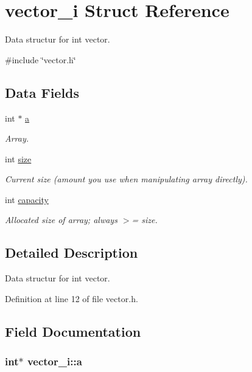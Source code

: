 \hypertarget{structvector__i}{
\section{vector\_\-i Struct Reference}
\label{structvector__i}
}


Data structur for int vector.  




{\ttfamily \#include \char`\"{}vector.h\char`\"{}}

\subsection*{Data Fields}
\begin{DoxyCompactItemize}
\item 
int $\ast$ \hyperlink{structvector__i_a1f7c0e586cb1e09323dec3dd48d13882}{a}
\begin{DoxyCompactList}\small\item\em Array. \item\end{DoxyCompactList}\item 
int \hyperlink{structvector__i_a04afc9e861d169d920fc8d2a26b670cd}{size}
\begin{DoxyCompactList}\small\item\em Current size (amount you use when manipulating array directly). \item\end{DoxyCompactList}\item 
int \hyperlink{structvector__i_af108aa670ac888975024a428c31f27fc}{capacity}
\begin{DoxyCompactList}\small\item\em Allocated size of array; always $>$= size. \item\end{DoxyCompactList}\end{DoxyCompactItemize}


\subsection{Detailed Description}
Data structur for int vector. 

Definition at line 12 of file vector.h.



\subsection{Field Documentation}
\hypertarget{structvector__i_a1f7c0e586cb1e09323dec3dd48d13882}{
\subsubsection[{a}]{\setlength{\rightskip}{0pt plus 5cm}int$\ast$ {\bf vector\_\-i::a}}}
\label{structvector__i_a1f7c0e586cb1e09323dec3dd48d13882}


